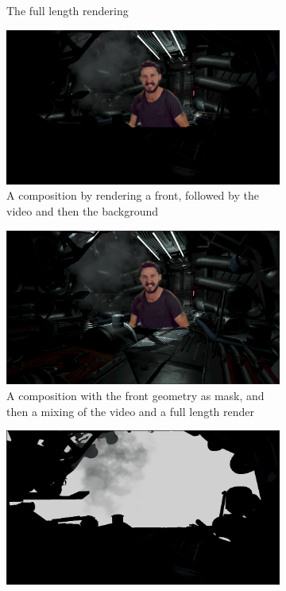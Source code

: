 \begin{figure}[htbp]
\begin{subfigure}[t]{.45\textwidth}
		\caption{The full length rendering}
	\end{subfigure}
	\newline
	\begin{subfigure}[t]{.45\textwidth}
		\centering
		\includegraphics[width=\textwidth]{_raw_resources/composition/Composition-Front-Replace_orso.png}
		\caption{A composition by rendering a front, followed by the video and 
		then the background}
	\end{subfigure}
	\begin{subfigure}[t]{.45\textwidth}
		\centering
		\includegraphics[width=\textwidth]{_raw_resources/composition/Composition-Front-Mask.png}
		\caption{A composition with the front geometry as mask, and then a 
		mixing of the video and a full length render}
	\end{subfigure}
	\newline
	\begin{subfigure}[t]{.45\textwidth}
		\centering
		\includegraphics[width=\textwidth]{_raw_resources/composition/Composition-Front.png}

\end{subfigure}
\end{figure}
